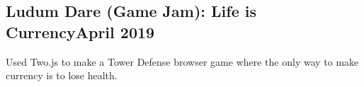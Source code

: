\documentclass[../Resume.tex]{subfiles}
\begin{document}
	\subsection{Ludum Dare (Game Jam): Life is Currency\null\hfill April 2019}
	\par Used Two.js to make a Tower Defense browser game where the only way to make currency is to lose health.
	\vspace*{-2mm}
\end{document}

